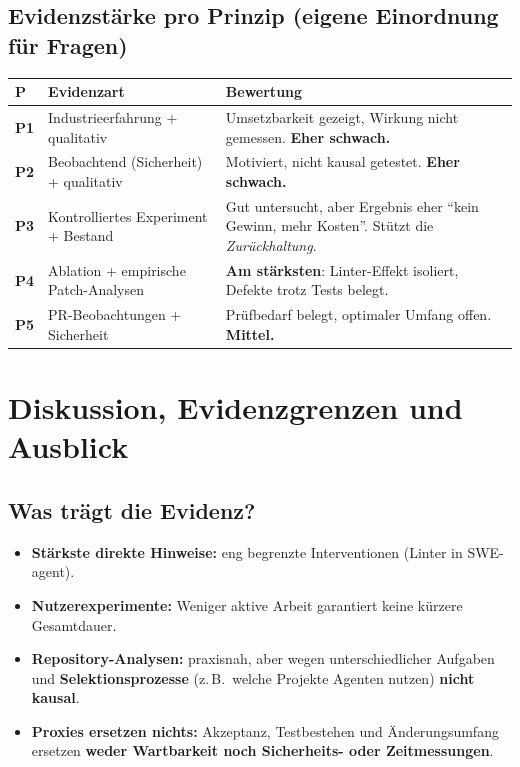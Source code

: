 \documentclass[12pt,a4paper]{article}
\begin{document}
\subsection*{Evidenzstärke pro Prinzip (eigene Einordnung für Fragen)}
\begin{longtable}{@{}>{\bfseries}p{1.2cm}p{5.4cm}p{9.3cm}@{}}
\toprule
P & Evidenzart & Bewertung \\
\midrule
\endhead
P1 & Industrieerfahrung + qualitativ & Umsetzbarkeit gezeigt, Wirkung nicht gemessen. \textbf{Eher schwach.} \\
P2 & Beobachtend (Sicherheit) + qualitativ & Motiviert, nicht kausal getestet. \textbf{Eher schwach.} \\
P3 & Kontrolliertes Experiment + Bestand & Gut untersucht, aber Ergebnis eher \enquote{kein Gewinn, mehr Kosten}. Stützt die \emph{Zurückhaltung}. \\
P4 & Ablation + empirische Patch-Analysen & \textbf{Am stärksten}: Linter-Effekt isoliert, Defekte trotz Tests belegt. \\
P5 & PR-Beobachtungen + Sicherheit & Prüfbedarf belegt, optimaler Umfang offen. \textbf{Mittel.} \\
\bottomrule
\end{longtable}

\section{Diskussion, Evidenzgrenzen und Ausblick}
\label{sec:grenzen}

\subsection{Was trägt die Evidenz?}
\begin{itemize}
  \item \textbf{Stärkste direkte Hinweise:} eng begrenzte Interventionen (Linter in SWE-agent).
  \item \textbf{Nutzerexperimente:} Weniger aktive Arbeit garantiert keine kürzere Gesamtdauer.
  \item \textbf{Repository-Analysen:} praxisnah, aber wegen unterschiedlicher Aufgaben und \textbf{Selektionsprozesse} (z.\,B.\ welche Projekte Agenten nutzen) \textbf{nicht kausal}.
  \item \textbf{Proxies ersetzen nichts:} Akzeptanz, Testbestehen und Änderungsumfang ersetzen \textbf{weder Wartbarkeit noch Sicherheits- oder Zeitmessungen}.
\end{itemize}
\end{document}
